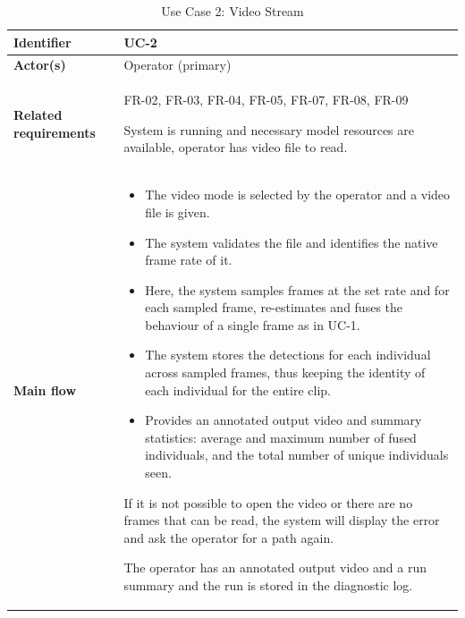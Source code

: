 

\begin{longtable}{|p{3.0cm}|p{12.5cm}|}

\caption{Use Case 2: Video Stream}
\label{tab:uc2} \\

\hline

\textbf{Identifier} &
UC-2
\\
\hline

\textbf{Actor(s)} &
Operator (primary)
\\
\hline

\textbf{Related requirements} &
FR-02, FR-03, FR-04, FR-05, FR-07, FR-08, FR-09

System is running and necessary model resources are available, operator has video file to read.
\\
\hline

\textbf{Main flow} &
\begin{itemize}[leftmargin=16pt, itemsep=0pt, topsep=0pt]
    \item The video mode is selected by the operator and a video file is given.
    
    \item The system validates the file and identifies the native frame rate of it.
    
    \item Here, the system samples frames at the set rate and for each sampled frame, re-estimates and fuses the behaviour of a single frame as in UC-1.
    
    \item The system stores the detections for each individual across sampled frames, thus keeping the identity of each individual for the entire clip.
    
    \item Provides an annotated output video and summary statistics: average and maximum number of fused individuals, and the total number of unique individuals seen.
\end{itemize}

If it is not possible to open the video or there are no frames that can be read, the system will display the error and ask the operator for a path again.

The operator has an annotated output video and a run summary and the run is stored in the diagnostic log.
\\
\hline

\end{longtable}



